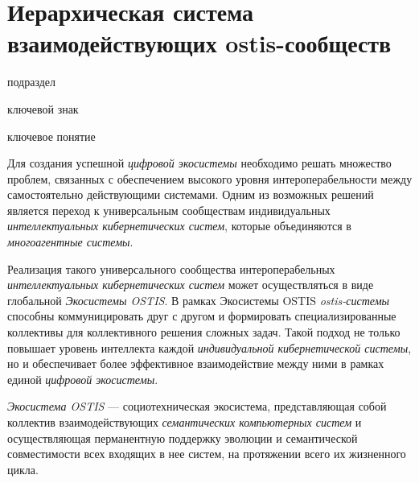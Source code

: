 \section{Иерархическая система взаимодействующих ostis-сообществ}
{\label{sec_ecosystem_structure}} 

\begin{SCn}

\begin{scnrelfromlist}{подраздел}
\end{scnrelfromlist}

\begin{scnrelfromlist}{ключевой знак}
\end{scnrelfromlist}

\begin{scnrelfromlist}{ключевое понятие}
\end{scnrelfromlist}


\end{SCn}

Для создания успешной \textit{цифровой экосистемы} необходимо решать множество проблем, связанных с обеспечением высокого уровня интероперабельности между самостоятельно действующими системами. Одним из возможных решений является переход к универсальным сообществам индивидуальных \textit{интеллектуальных кибернетических систем}, которые объединяются в \textit{многоагентные системы}.

Реализация такого универсального сообщества интероперабельных \textit{интеллектуальных кибернетических систем} может осуществляться в виде глобальной \textit{Экосистемы OSTIS}. В рамках Экосистемы OSTIS \textit{ostis-системы} способны коммуницировать друг с другом и формировать специализированные коллективы для коллективного решения сложных задач. Такой подход не только повышает уровень интеллекта каждой \textit{индивидуальной кибернетической системы}, но и обеспечивает более эффективное взаимодействие между ними в рамках единой \textit{цифровой экосистемы}.

\textit{Экосистема OSTIS} --- социотехническая экосистема, представляющая собой коллектив взаимодействующих \textit{семантических компьютерных систем} и осуществляющая перманентную поддержку эволюции и семантической совместимости всех входящих в нее систем, на протяжении всего их жизненного цикла. 

